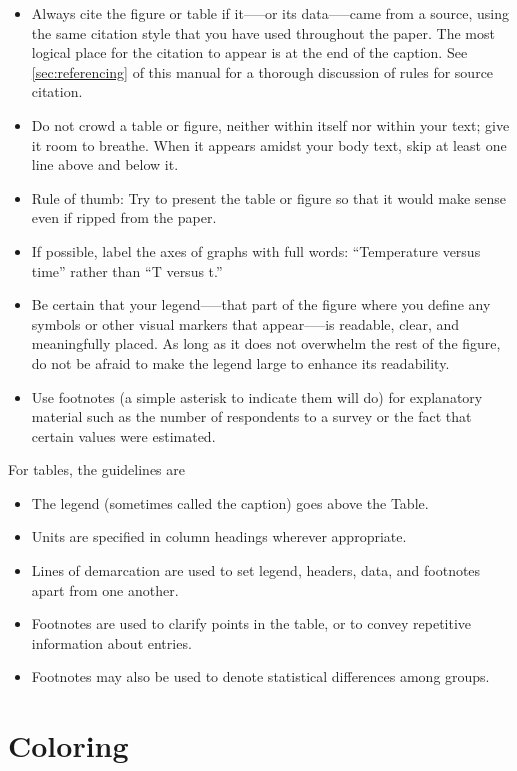 \begin{itemize}
    \item Always cite the figure or table if it—--or its data—--came from a source, using the same citation style that you have used throughout the paper. The most logical place for the citation to appear is at the end of the caption. See \cref{sec:referencing} of this manual for a thorough discussion of rules for source citation.
    \item Do not crowd a table or figure, neither within itself nor within your text; give it room to breathe. When it appears amidst your body text, skip at least one line above and below it.
    \item Rule of thumb: Try to present the table or figure so that it would make sense even if ripped from the paper.
    \item If possible, label the axes of graphs with full words: ``Temperature versus time'' rather than ``T versus t.''
    \item Be certain that your legend—--that part of the figure where you define any symbols or other visual markers that appear—--is readable, clear, and meaningfully placed. As long as it does not overwhelm the rest of the figure, do not be afraid to make the legend large to enhance its readability.
    \item Use footnotes (a simple asterisk to indicate them will do) for explanatory material such as the number of respondents to a survey or the fact that certain values were estimated.
\end{itemize}

For tables, the guidelines are

\begin{itemize}
    \item The legend (sometimes called the caption) goes above the Table.
    \item Units are specified in column headings wherever appropriate.
    \item Lines of demarcation are used to set legend, headers, data, and footnotes apart from one another.
    \item Footnotes are used to clarify points in the table, or to convey repetitive information about entries.
    \item Footnotes may also be used to denote statistical differences among groups.
\end{itemize}


\section{Coloring}

